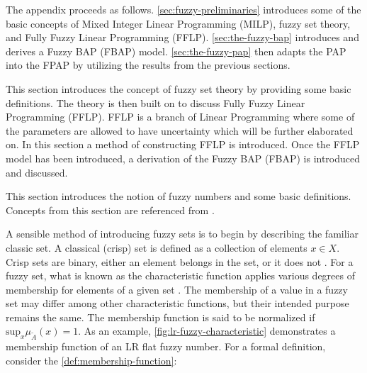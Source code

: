 \documentclass[ee,thesis]{usuthesis}
\begin{document}
The appendix proceeds as follows. \ref{sec:fuzzy-preliminaries} introduces some of the basic concepts of Mixed Integer
Linear Programming (MILP), fuzzy set theory, and Fully Fuzzy Linear Programming (FFLP). \ref{sec:the-fuzzy-bap}
introduces and derives a Fuzzy BAP (FBAP) model. \ref{sec:the-fuzzy-pap} then adapts the PAP into the FPAP by utilizing
the results from the previous sections.

\label{sec:fuzzy-preliminaries}

This section introduces the concept of fuzzy set theory by providing some basic definitions. The theory is then built on to discuss Fully Fuzzy Linear Programming (FFLP). FFLP is a branch of Linear Programming where some of the parameters are allowed to have uncertainty which will be further elaborated on. In this section a method of constructing FFLP is introduced. Once the FFLP model has been introduced, a derivation of the Fuzzy BAP (FBAP) is introduced and discussed.

\label{sec:fuzzy-set-theory}
This section introduces the notion of fuzzy numbers and some basic definitions. Concepts from this section are
referenced from
\cite{zimmermann-2001-fuzzy-set,das-2016-mathem-model,yaghobi-2014-compar-fuzzy,bello-2019-fuzzy-activ,kaur-2016-introd-fuzzy}.

\label{sec:fuzzy-sets}
A sensible method of introducing fuzzy sets is to begin by describing the familiar classic set. A classical (crisp) set
is defined as a collection of elements \(x \in X\). Crisp sets are binary, either an element belongs in the set, or it does
not \cite{zimmermann-2001-fuzzy-set}. For a fuzzy set, what is known as the characteristic function applies various
degrees of membership for elements of a given set \cite{zimmermann-2001-fuzzy-set}. The membership of a value in a
fuzzy set may differ among other characteristic functions, but their intended purpose remains the same. The
membership function is said to be normalized if \(\text{sup}_x \mu_{\tilde{A}}(x) = 1\). As an example,
\ref{fig:lr-fuzzy-characteristic} demonstrates a membership function of an LR flat fuzzy number. For a formal definition, consider
the \ref{def:membership-function}:
\end{document}
